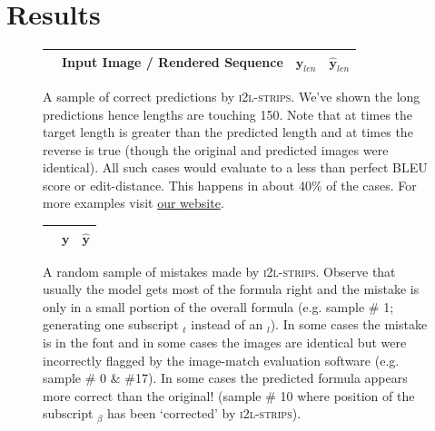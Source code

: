 \documentclass{article}
\newcommand{\website}{https://untrix.github.io/i2l/}
\begin{document}
\section{Results}
\begin{figure}%
	\begin{tabular}{llcc}
		& Input Image / Rendered Sequence & $\boldsymbol{y}_{len}$ & $\boldsymbol{\hat{y}}_{len}$ \\
		\hline
		
	\end{tabular}
	\centering
	\caption[A Sample of Correct Predictions]{A sample of correct predictions by \textsc{i2l-strips}. We've shown the long predictions hence lengths are touching 150. Note that at times the target length is greater than the predicted length and at times the reverse is true (though the original and predicted images were identical). All such cases would evaluate to a less than perfect BLEU score or edit-distance. This happens in about 40\% of the cases. For more examples visit \href{\website}{our website}.}
	\label{fig-good-preds}
\end{figure}
\begin{figure}
	\begin{tabular}{lll}
		& $\boldsymbol{y}$ & $\boldsymbol{\hat{y}}$ \\
		\hline
		
	\end{tabular}
	\centering
	\caption[Random Sample of Mistakes]{A random sample of mistakes made by \textsc{i2l-strips}. Observe that usually the model gets most of the formula right and the mistake is only in a small portion of the overall formula (e.g. sample \# 1; generating one subscript $_t$ instead of an $_l$). In some cases the mistake is in the font and in some cases the images are identical but were incorrectly flagged by the image-match evaluation software (e.g. sample \# 0 \& \#17). In some cases the predicted formula appears more correct than the original! (sample \# 10 where position of the subscript $_{\beta}$ has been `corrected' by \textsc{i2l-strips}).
	}
	\label{fig-bad-preds}
\end{figure}
\end{document}
